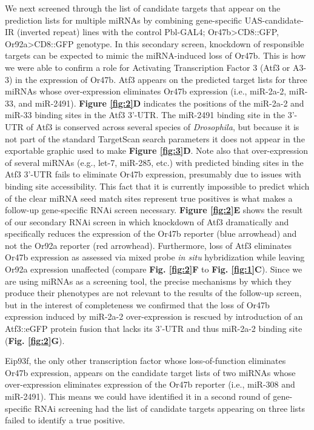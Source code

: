 We next screened through the list of candidate targets that appear on the prediction lists for multiple miRNAs by combining gene-specific UAS-candidate-IR (inverted repeat) lines with the control Pbl-GAL4; Or47b\textgreater{}CD8::GFP, Or92a\textgreater{}CD8::GFP genotype.
In this secondary screen, knockdown of responsible targets can be expected to mimic the miRNA-induced loss of Or47b.
This is how we were able to confirm a role for Activating Transcription Factor 3 (Atf3 or A3-3) in the expression of Or47b.
Atf3 appears on the predicted target lists for three miRNAs whose over-expression eliminates Or47b expression (i.e., miR-2a-2, miR-33, and miR-2491).
\textbf{Figure \ref{fig:2}D} indicates the positions of the miR-2a-2 and miR-33 binding sites in the Atf3 3'-UTR.
The miR-2491 binding site in the 3'-UTR of Atf3 is conserved across several species of \textit{Drosophila}, but because it is not part of the standard TargetScan search parameters it does not appear in the exportable graphic used to make \textbf{Figure \ref{fig:3}D}.
Note also that over-expression of several miRNAs (e.g., let-7, miR-285, etc.) with predicted binding sites in the Atf3 3'-UTR fails to eliminate Or47b expression, presumably due to issues with binding site accessibility.
This fact that it is currently impossible to predict which of the clear miRNA seed match sites represent true positives is what makes a follow-up gene-specific RNAi screen necessary.
\textbf{Figure \ref{fig:2}E} shows the result of our secondary RNAi screen in which knockdown of Atf3 dramatically and specifically reduces the expression of the Or47b reporter (blue arrowhead) and not the Or92a reporter (red arrowhead).
Furthermore, loss of Atf3 eliminates Or47b expression as assessed via mixed probe \textit{in situ} hybridization while leaving Or92a expression unaffected (compare \textbf{Fig. \ref{fig:2}F} to \textbf{Fig. \ref{fig:1}C}).
Since we are using miRNAs as a screening tool, the precise mechanisms by which they produce their phenotypes are not relevant to the results of the follow-up screen, but in the interest of completeness we confirmed that the loss of Or47b expression induced by miR-2a-2 over-expression is rescued by introduction of an Atf3::eGFP protein fusion that lacks its 3'-UTR and thus miR-2a-2 binding site (\textbf{Fig.
\ref{fig:2}G}).

Eip93f, the only other transcription factor whose loss-of-function eliminates Or47b expression, appears on the candidate target lists of two miRNAs whose over-expression eliminates expression of the Or47b reporter (i.e., miR-308 and miR-2491).
This means we could have identified it in a second round of gene-specific RNAi screening had the list of candidate targets appearing on three lists failed to identify a true positive.